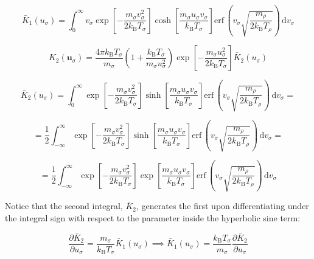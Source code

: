 \begin{equation}
    \bar{K}_1(u_\sigma)=\int_0^\infty v_\sigma\exp{\left[-\frac{m_\sigma v_\sigma^2}{2k_\mathrm{B}T_\sigma}\right]}\cosh{\left[\frac{m_\sigma u_\sigma v_\sigma}{k_\mathrm{B}T_\sigma}\right]}\text{erf}\,\left(v_\sigma\sqrt{\frac{m_\rho}{2k_\mathrm{B}T_\rho}}\right)\,\mathrm{d}v_\sigma
\end{equation}

\begin{equation}
    K_2(\mathbf{u}_\sigma)=\frac{4\pi k_\mathrm{B}T_\sigma}{m_\sigma}\left(1+\frac{k_\mathrm{B}T_\sigma}{m_\sigma u_\sigma^2}\right)\exp{\left[-\frac{m_\sigma u_\sigma^2}{2k_\mathrm{B}T_\sigma}\right]}\bar{K}_2(u_\sigma)
\end{equation}

\begin{equation}
    \bar{K}_2(u_\sigma)=\int_{0}^\infty\exp{\left[-\frac{m_\sigma v_\sigma^2}{2k_\mathrm{B}T_\sigma}\right]}\sinh{\left[\frac{m_\sigma u_\sigma v_\sigma}{k_\mathrm{B}T_\sigma}\right]}\text{erf}\,\left(v_\sigma\sqrt{\frac{m_\rho}{2k_\mathrm{B}T_\rho}}\right)\,\mathrm{d}v_\sigma=
\end{equation}

\begin{equation}
    =\frac{1}{2}\int_{-\infty}^{\infty}\exp{\left[-\frac{m_\sigma v_\sigma^2}{2k_\mathrm{B}T_\sigma}\right]}\sinh{\left[\frac{m_\sigma u_\sigma v_\sigma}{k_\mathrm{B}T_\sigma}\right]}\text{erf}\,\left(v_\sigma\sqrt{\frac{m_\rho}{2k_\mathrm{B}T_\rho}}\right)\,\mathrm{d}v_\sigma=
\end{equation}

\begin{equation}
    =\frac{1}{2}\int_{-\infty}^\infty\exp{\left[-\frac{m_\sigma v_\sigma^2}{2k_\mathrm{B}T_\sigma}\right]}\exp{\left[\frac{m_\sigma u_\sigma v_\sigma}{k_\mathrm{B}T_\sigma}\right]}\text{erf}\,\left(v_\sigma\sqrt{\frac{m_\rho}{2k_\mathrm{B}T_\rho}}\right)\,\mathrm{d}v_\sigma
\end{equation}

Notice that the second integral, $\bar{K}_2$, generates the first upon differentiating under the integral sign with respect to the parameter inside the hyperbolic sine term:

\begin{equation}
    \frac{\partial\bar{K}_2}{\partial u_\sigma}=\frac{m_\sigma}{k_\mathrm{B}T_\sigma}\bar{K}_1(u_\sigma)\implies\bar{K}_1(u_\sigma)=\frac{k_\mathrm{B}T_\sigma}{m_\sigma}\frac{\partial\bar{K}_2}{\partial u_\sigma}
\end{equation}

